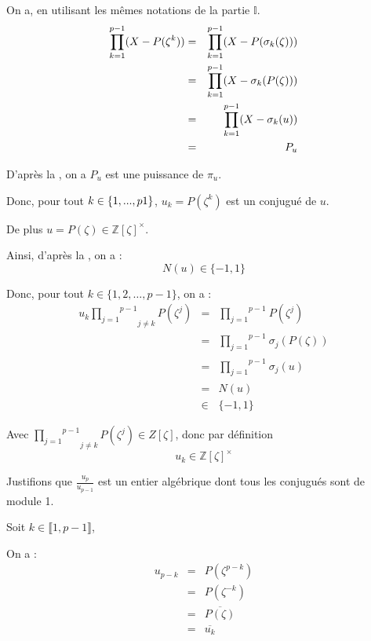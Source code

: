 On a, en utilisant les m{\^e}mes notations de la partie $\mathbb{I}$.
\begin{eqnarray*}
  \underset{k = 1}{\overset{p - 1}{\prod}} (X - P (\zeta^k)) & = & \underset{k
  = 1}{\overset{p - 1}{\prod}} (X - P (\sigma_k (\zeta)))\\
  & = & \underset{k = 1}{\overset{p - 1}{\prod}} (X - \sigma_k (P (\nobracket
  \zeta) \nobracket))\\
  & = & \underset{k = 1}{\overset{p - 1}{\prod}} (X - \sigma_k (u))\\
  & = & P_u
\end{eqnarray*}


D'apr{\`e}s la , on a $P_u$
est une puissance de ${\pi_u} $.

Donc, pour tout $k \in \{1, . . ., p \nonconverted{minus} 1\}$, $u_k = P
(\zeta^k)$ est un conjugu{\'e} de $u$.

De plus $u = P (\zeta) \in \mathbb{Z}[\zeta]^{\times}$.

Ainsi, d'apr{\`e}s la , on a :
\[ N (u) \in \{ - 1, 1 \} \]


Donc, pour tout $k \in \{ 1, 2, \ldots, p - 1 \}$, on a :
\begin{eqnarray*}
  u_k \underset{j \neq k}{\overset{p - 1}{\underset{j = 1}{\prod}}} P
  (\zeta^j) & = & \underset{}{\overset{p - 1}{\underset{j = 1}{\prod}}} P
  (\zeta^j)\\
  & = & \underset{}{\overset{p - 1}{\underset{j = 1}{\prod}}} \sigma_j (P
  (\zeta ))\\
  & = & \underset{}{\overset{p - 1}{\underset{j = 1}{\prod}}} \sigma_j (u)\\
  & = & N (u)\\
  & \in & \{ - 1, 1 \}
\end{eqnarray*}


Avec $\underset{j \neq k}{\overset{p - 1}{\underset{j = 1}{\prod}}} P
(\zeta^j) \in Z [\zeta]$, donc par d{\'e}finition
\[ u_k \in \mathbb{Z} [\zeta]^{\times} \]


 Justifions que $\frac{u_p}{u_{p - 1}}$ est un entier
alg{\'e}brique dont tous les conjugu{\'e}s sont de module 1.

Soit $k \in \llbracket 1, p - 1 \rrbracket$,

On a :
\begin{eqnarray*}
  u_{p - k} & = & P (\zeta^{p - k})\\
  & = & P (\zeta^{- k})\\
  & = & \overline{P (\zeta)}\\
  & = & \overline{u_k}
\end{eqnarray*}


